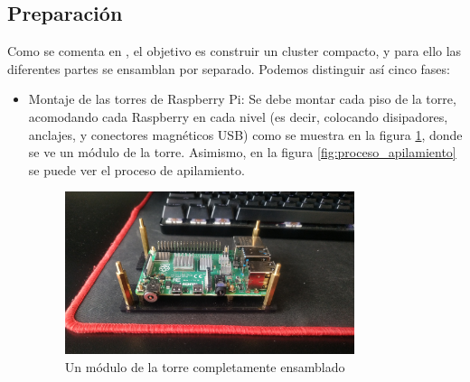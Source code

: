 \subsection{Preparación}
Como se comenta en , el objetivo es construir un cluster compacto, y para ello las diferentes partes se ensamblan por separado. Podemos distinguir así cinco fases:
\begin{itemize}
    \item Montaje de las torres de Raspberry Pi: Se debe montar cada piso de la torre, acomodando cada Raspberry en cada nivel (es decir, colocando disipadores, anclajes, y conectores magnéticos USB) como se muestra en la figura \ref{fig:modulo_raspi_torre}, donde se ve un módulo de la torre. Asimismo, en la figura \ref{fig:proceso_apilamiento} se puede ver el proceso de apilamiento.

    \begin{figure}[h!]
    \centering
    \includegraphics[width=0.8\textwidth]{img/modulo_raspi_torre.jpg}
    \caption{Un módulo de la torre completamente ensamblado}
    \label{fig:modulo_raspi_torre}
    \end{figure}


\end{itemize}
